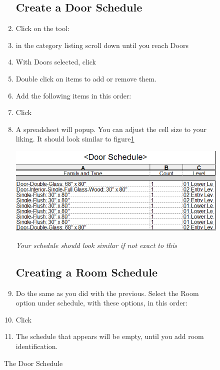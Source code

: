 \documentclass{tufte-book} %
\begin{document}
\begin{figure}
\begin{enumerate}
	\subsection{Create a Door Schedule}
		\item Click on the tool: 
		\item in the category listing scroll down until you reach Doors
		\item With Doors selected, click 
		\item Double click on items to add or remove them.
		\item Add the following items in this order: 
		\item Click 
		\item A spreadsheet will popup. You can adjust the cell size to your liking. It should look similar to figure\ref{fig:revdoorschedule}
		
		\begin{marginfigure}
			\includegraphics[width=\linewidth]{revitdoorschedule.png}
			\caption{The Door Schedule}
			\emph{Your schedule should look similar if not exact to this}
			\label{fig:revdoorschedule}
		\end{marginfigure}
		

	\subsection{Creating a Room Schedule}
		\item Do the same as you did with the previous. Select the Room option under  schedule, with these options, in this order: 
		\item Click 
		\item The schedule that appears will be empty, until you add room identification.
		

\end{enumerate}
\end{figure}
\end{document}
